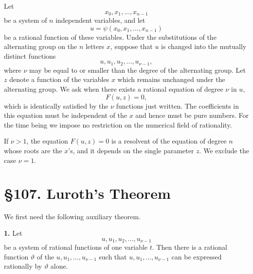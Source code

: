 \documentclass[11pt,a4paper]{book}
\newcommand{\webersection}[2]{\clearpage\section*{\S #1. #2}}
\begin{document}
Let
\[
 x_0,x_1,\ldots,x_{n-1}
\]
be a system of $n$ independent variables, and let
\begin{equation}
 u=\psi(x_0,x_1,\ldots,x_{n-1})
\end{equation}
be a rational function of these variables.  Under the substitutions of the alternating group on the $n$ letters $x$, suppose that $u$ is changed into the mutually distinct functions
\begin{equation}
 u,u_1,u_2,\ldots,u_{\nu-1},
\end{equation}
where $\nu$ may be equal to or smaller than the degree of the alternating group.  Let $z$ denote a function of the variables $x$ which remains unchanged under the alternating group.  We ask when there exists a rational equation of degree $\nu$ in $u$,
\begin{equation}
 F(u,z)=0,
\end{equation}
which is identically satisfied by the $\nu$ functions just written.  The coefficients in this equation must be independent of the $x$ and hence must be pure numbers.  For the time being we impose no restriction on the numerical field of rationality.

If $\nu>1$, the equation $F(u,z)=0$ is a resolvent of the equation of degree $n$ whose roots are the $x$'s, and it depends on the single parameter $z$.  We exclude the case $\nu=1$.

\webersection{107}{Luroth's Theorem}

We first need the following auxiliary theorem.

\textbf{1.} Let
\[
 u,u_1,u_2,\ldots,u_{\nu-1}
\]
be a system of rational functions of one variable $t$.  Then there is a rational function $\vartheta$ of the $u,u_1,\ldots,u_{\nu-1}$ such that $u,u_1,\ldots,u_{\nu-1}$ can be expressed rationally by $\vartheta$ alone.
\end{document}
